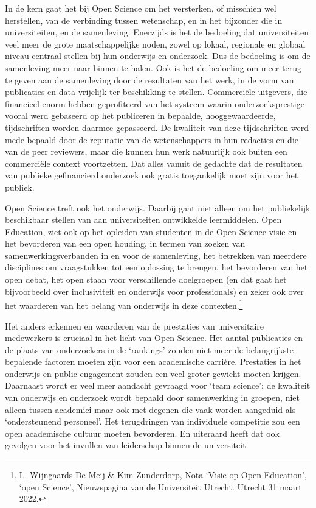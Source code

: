 \documentclass{jote-book}
\begin{document}
	In de kern gaat het bij Open Science om het versterken, of misschien wel herstellen, van de verbinding tussen wetenschap, en in het bijzonder die in universiteiten, en de samenleving. Enerzijds is het de bedoeling dat universiteiten veel meer de grote maatschappelijke noden, zowel op lokaal, regionale en globaal niveau centraal stellen bij hun onderwijs en onderzoek. Dus de bedoeling is om de samenleving meer naar binnen te halen. Ook is het de bedoeling om meer terug te geven aan de samenleving door de resultaten van het werk, in de vorm van publicaties en data vrijelijk ter beschikking te stellen. Commerciële uitgevers, die financieel enorm hebben geprofiteerd van het systeem waarin onderzoeksprestige vooral werd gebaseerd op het publiceren in bepaalde, hooggewaardeerde, tijdschriften worden daarmee gepasseerd. De kwaliteit van deze tijdschriften werd mede bepaald door de reputatie van de wetenschappers in hun redacties en die van de peer reviewers, maar die kunnen hun werk natuurlijk ook buiten een commerciële context voortzetten. Dat alles vanuit de gedachte dat de resultaten van publieke gefinancierd onderzoek ook gratis toegankelijk moet zijn voor het publiek.



	Open Science treft ook het onderwijs. Daarbij gaat niet alleen om het publiekelijk beschikbaar stellen van aan universiteiten ontwikkelde leermiddelen. Open Education, ziet ook op het opleiden van studenten in de Open Science-visie en het bevorderen van een open houding, in termen van zoeken van samenwerkingsverbanden in en voor de samenleving, het betrekken van meerdere disciplines om vraagstukken tot een oplossing te brengen, het bevorderen van het open debat, het open staan voor verschillende doelgroepen (en dat gaat het bijvoorbeeld over inclusiviteit en onderwijs voor professionals) en zeker ook over het waarderen van het belang van onderwijs in deze contexten.\footnote{L. Wijngaards-De Meij \& Kim Zunderdorp, Nota ‘Visie op Open Education', ‘open Science', Nieuwspagina van de Universiteit Utrecht. Utrecht 31 maart 2022. }



	Het anders erkennen en waarderen van de prestaties van universitaire medewerkers is cruciaal in het licht van Open Science. Het aantal publicaties en de plaats van onderzoekers in de ‘rankings' zouden niet meer de belangrijkste bepalende factoren moeten zijn voor een academische carrière. Prestaties in het onderwijs en public engagement zouden een veel groter gewicht moeten krijgen. Daarnaast wordt er veel meer aandacht gevraagd voor ‘team science'; de kwaliteit van onderwijs en onderzoek wordt bepaald door samenwerking in groepen, niet alleen tussen academici maar ook met degenen die vaak worden aangeduid als ‘ondersteunend personeel'. Het terugdringen van individuele competitie zou een open academische cultuur moeten bevorderen. En uiteraard heeft dat ook gevolgen voor het invullen van leiderschap binnen de universiteit.
\end{document}
